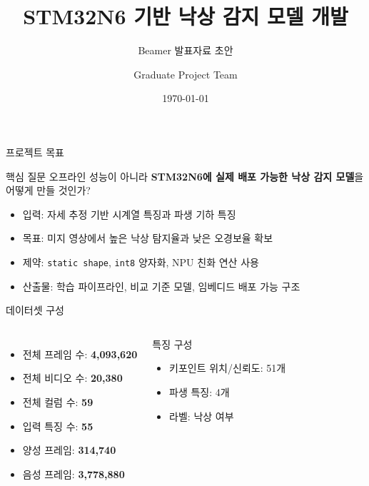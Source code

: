 \documentclass[aspectratio=169]{beamer}
\title{STM32N6 기반 낙상 감지 모델 개발}
\subtitle{Beamer 발표자료 초안}
\author{Graduate Project Team}
\institute{Falling Model Development}
\date{\today}
\begin{document}
\begin{frame}
  \titlepage
\end{frame}

\begin{frame}{프로젝트 목표}
  \begin{block}{핵심 질문}
    오프라인 성능이 아니라 \textbf{STM32N6에 실제 배포 가능한 낙상 감지 모델}을 어떻게 만들 것인가?
  \end{block}

  \begin{itemize}
    \item 입력: 자세 추정 기반 시계열 특징과 파생 기하 특징
    \item 목표: 미지 영상에서 높은 낙상 탐지율과 낮은 오경보율 확보
    \item 제약: \texttt{static shape}, \texttt{int8} 양자화, NPU 친화 연산 사용
    \item 산출물: 학습 파이프라인, 비교 기준 모델, 임베디드 배포 가능 구조
  \end{itemize}
\end{frame}

\begin{frame}{데이터셋 구성}
  \begin{columns}[T]
    \begin{itemize}
      \item 전체 프레임 수: \textbf{4,093,620}
      \item 전체 비디오 수: \textbf{20,380}
      \item 전체 컬럼 수: \textbf{59}
      \item 입력 특징 수: \textbf{55}
      \item 양성 프레임: \textbf{314,740}
      \item 음성 프레임: \textbf{3,778,880}
    \end{itemize}

    \begin{block}{특징 구성}
      \begin{itemize}
        \item 키포인트 위치/신뢰도: 51개
        \item 파생 특징: 4개
        \item 라벨: 낙상 여부
      \end{itemize}
    \end{block}
  \end{columns}
\end{frame}
\end{document}
